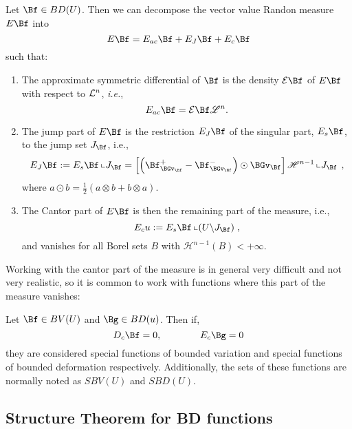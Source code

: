 \begin{definition} Let $\Bf \in B D(U)$. Then we can decompose the vector value Randon measure $E\Bf$ into
$$E \Bf=E _{ac}\Bf+E_J\Bf +E_c\Bf$$
such that:
\begin{enumerate}
\item The approximate symmetric differential of $\Bf$ is the density $\CE \Bf$ of $E\Bf$ with respect to ${\mathcal L}^n$, \textit{i.e.}, 
$$E_{ac} \Bf=\CE \Bf \mathscr{L}^n.$$
\item The jump part of $E \Bf$ is the restriction $E_J \Bf$ of  the singular part, $E_s \Bf$, to the jump set $J_\Bf$, i.e., $$E_J \Bf :=E_s \Bf\left\llcorner J_\Bf =\left[ \left(\Bf_{\BGv_\Bf}^{+}-\Bf_{\BGv_\Bf}^{-}\right) \odot \BGv_\Bf\right] \mathscr{H}^{n-1}\left\llcorner J_\Bf\right.\right. ,$$
where  $a \odot b=\frac{1}{2}(a \otimes b+b \otimes a)$.
\item The Cantor part of $E \Bf$ is then the remaining part of the measure, i.e., $$E_c u:=E_s \Bf\left\llcorner\left(U \backslash J_\Bf\right)\right. ,$$
and vanishes for all Borel sets $B$ with $\mathscr{H}^{n-1}(B)<+\infty$.
\end{enumerate}
\end{definition}

Working with the cantor part of the measure is in general very difficult and not very realistic, so it is common to work with functions where this part of the measure vanishes:

\begin{definition} Let $\Bf\in BV(U)$ and $\Bg\in BD(u)$. Then if,
    $$D_c \Bf = 0, \qquad\qquad E_c \Bg =0$$
they are considered special functions of bounded variation and special functions of bounded deformation respectively. Additionally, the sets of these functions are normally noted as $SBV(U)$ and $SBD(U)$.
\end{definition}

\subsection{ Structure Theorem for BD functions}

